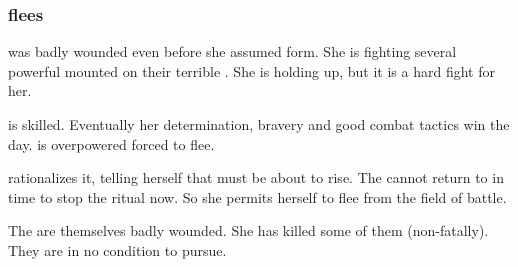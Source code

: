 \begin{prose}
\end{prose}





\subsubsection{\Nzessuacrith flees}
\Nzessuacrith was badly wounded even before she assumed \draconian form.
She is fighting several powerful \resphain mounted on their terrible \umbrae. 
She is holding up, but it is a hard fight for her. 

\Achsah is skilled. 
Eventually her determination, bravery and good combat tactics win the day. 
\Nzessuacrith is overpowered forced to flee. 

\Nzessuacrith rationalizes it, telling herself that \Nithdornazsh must be about to rise. 
The \resphain cannot return to \Malcur in time to stop the ritual now. 
So she permits herself to flee from the field of battle. 

The \resphain are themselves badly wounded.
She has killed some of them (non-fatally).
They are in no condition to pursue. 





% 
% 
% 





